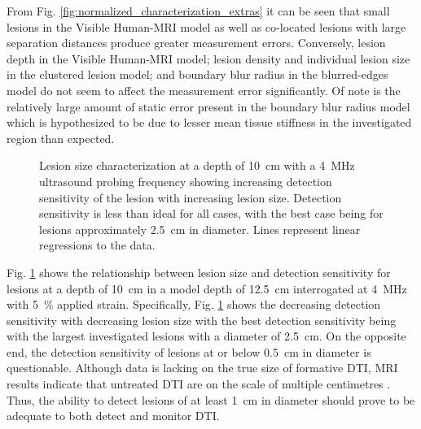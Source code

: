 			From Fig. \ref{fig:normalized_characterization_extras} it can be seen that small lesions in the Visible Human-MRI model as well as co-located lesions with large separation distances produce greater measurement errors. Conversely, lesion depth in the Visible Human-MRI model; lesion density and individual lesion size in the clustered lesion model; and boundary blur radius in the blurred-edges model do not seem to affect the measurement error significantly. Of note is the relatively large amount of static error present in the boundary blur radius model which is hypothesized to be due to lesser mean tissue stiffness in the investigated region than expected.

			\begin{figure}[!htb]
				\centering
				\caption[Quasi-static lesion size characterization]{Lesion size characterization at a depth of \SI{10}{\cm} with a \SI{4}{\MHz} ultrasound probing frequency showing increasing detection sensitivity of the lesion with increasing lesion size. Detection sensitivity is less than ideal for all cases, with the best case being for lesions approximately \SI{2.5}{\cm} in diameter. Lines represent linear regressions to the data.}
				\label{fig:size_characterization}
			\end{figure}

			Fig. \ref{fig:size_characterization} shows the relationship between lesion size and detection sensitivity for lesions at a depth of \SI{10}{\cm} in a model depth of \SI{12.5}{\cm} interrogated at \SI{4}{\MHz} with \SI{5}{\percent} applied strain. Specifically, Fig. \ref{fig:size_characterization} shows the decreasing detection sensitivity with decreasing lesion size with the best detection sensitivity being with the largest investigated lesions with a diameter of \SI{2.5}{\cm}. On the opposite end, the detection sensitivity of lesions at or below \SI{0.5}{\cm} in diameter is questionable. Although data is lacking on the true size of formative DTI, MRI results indicate that untreated DTI are on the scale of multiple centimetres \cite{solis13}. Thus, the ability to detect lesions of at least \SI{1}{\cm} in diameter should prove to be adequate to both detect and monitor DTI.

